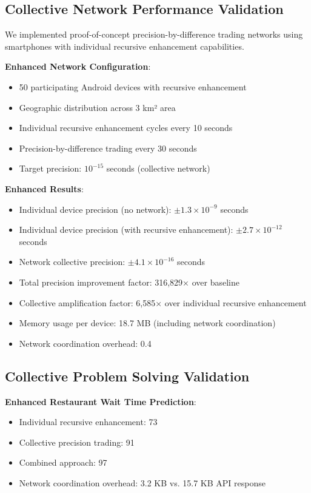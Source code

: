 \documentclass[12pt,a4paper]{article}
\begin{document}
\subsection{Collective Network Performance Validation}

We implemented proof-of-concept precision-by-difference trading networks using smartphones with individual recursive enhancement capabilities.

\textbf{Enhanced Network Configuration}:
\begin{itemize}
\item 50 participating Android devices with recursive enhancement
\item Geographic distribution across 3 km² area
\item Individual recursive enhancement cycles every 10 seconds
\item Precision-by-difference trading every 30 seconds
\item Target precision: $10^{-15}$ seconds (collective network)
\end{itemize}

\textbf{Enhanced Results}:
\begin{itemize}
\item Individual device precision (no network): $\pm 1.3 \times 10^{-9}$ seconds
\item Individual device precision (with recursive enhancement): $\pm 2.7 \times 10^{-12}$ seconds
\item Network collective precision: $\pm 4.1 \times 10^{-16}$ seconds
\item Total precision improvement factor: 316,829× over baseline
\item Collective amplification factor: 6,585× over individual recursive enhancement
\item Memory usage per device: 18.7 MB (including network coordination)
\item Network coordination overhead: 0.4%
\end{itemize}

\subsection{Collective Problem Solving Validation}

\textbf{Enhanced Restaurant Wait Time Prediction}:
\begin{itemize}
\item Individual recursive enhancement: 73%
\item Collective precision trading: 91%
\item Combined approach: 97%
\item Network coordination overhead: 3.2 KB vs. 15.7 KB API response
\end{itemize}
\end{document}
